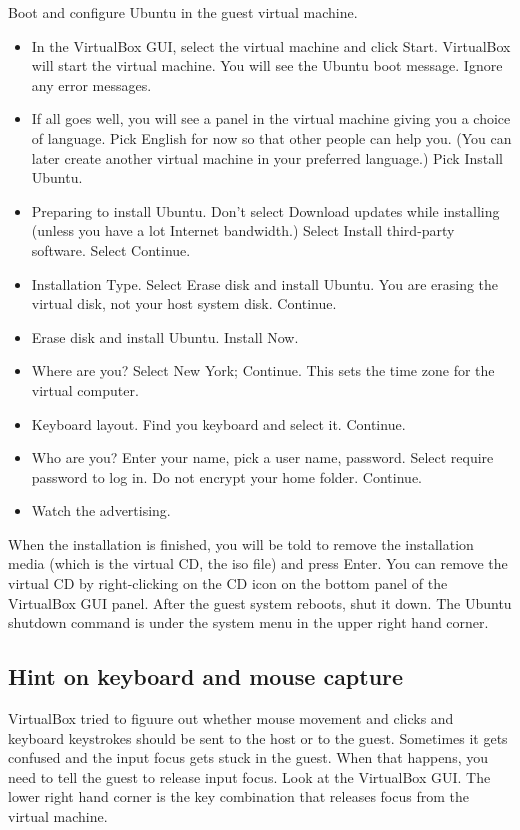 \documentclass{article}
\begin{document}
Boot and configure Ubuntu in the guest virtual machine.
\begin{itemize}
\item In the VirtualBox GUI, select the virtual machine and click
  Start. VirtualBox will start the virtual machine. You will see the
  Ubuntu boot message. Ignore any error messages.
\item If all goes well, you will see a panel in the virtual machine
  giving you a choice of language. Pick English for now so that other
  people can help you. (You can later create another virtual machine
  in your preferred language.) Pick Install Ubuntu.
\item Preparing to install Ubuntu. Don't select Download updates while
  installing (unless you have a lot Internet bandwidth.) Select
  Install third-party software. Select Continue.
\item Installation Type. Select Erase disk and install Ubuntu. You are
  erasing the virtual disk, not your host system disk. Continue.
\item Erase disk and install Ubuntu. Install Now.
\item Where are you? Select New York; Continue. This sets the time zone
  for the virtual computer.
\item Keyboard layout. Find you keyboard and select it. Continue.
\item Who are you? Enter your name, pick a user name, password. Select
  require password to log in. Do not encrypt your home folder. Continue.
\item Watch the advertising.
\end{itemize}

When the installation is finished, you will be told to remove the installation media
(which is the virtual CD, the iso file) and press Enter. You can remove
the virtual CD by right-clicking on the CD icon on the bottom panel of the 
VirtualBox GUI panel. After the guest system reboots, shut it down. The Ubuntu shutdown
command is under the system menu in the upper right hand corner.

\subsection{Hint on keyboard and mouse capture}

VirtualBox tried to figuure out whether mouse movement and clicks and
keyboard keystrokes should be sent to the host or to the guest.
Sometimes it gets confused and the input focus gets stuck in
the guest. When that happens, you need to tell the guest
to release input focus. Look at the VirtualBox GUI. The lower
right hand corner is the key combination that releases focus from the
virtual machine.
\end{document}
